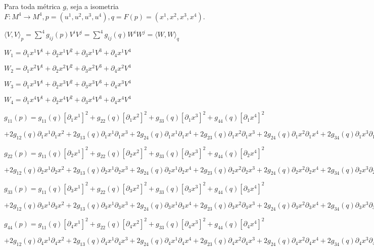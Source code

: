 		Para toda m\'etrica $g$, seja a isometria $F: M^4 \rightarrow M^4, p = (u^1, u^2, u^3, u^4), q = F(p) = (x^1, x^2, x^3, x^4)$.

		$\langle V, V\rangle_p = \sum^4 g_{ij}(p) V^i V^j = \sum^4 g_{ij}(q) W^i W^j = \langle W, W\rangle_q$

		$W_1 = \partial_1 x^1 V^1 + \partial_2 x^1 V^2 + \partial_3 x^1 V^3 + \partial_4 x^1 V^4$

		$W_2 = \partial_1 x^2 V^1 + \partial_2 x^2 V^2 + \partial_3 x^2 V^3 + \partial_4 x^2 V^4$

		$W_3 = \partial_1 x^3 V^1 + \partial_2 x^3 V^2 + \partial_3 x^3 V^3 + \partial_4 x^3 V^4$

		$W_4 = \partial_1 x^4 V^1 + \partial_2 x^4 V^2 + \partial_3 x^4 V^3 + \partial_4 x^4 V^4$

		$g_{11}(p) = g_{11}(q) [\partial_1 x^1]^2 + g_{22}(q) [\partial_1 x^2]^2 + g_{33}(q) [\partial_1 x^3]^2 + g_{44}(q) [\partial_1 x^4]^2$

		$+ 2 g_{12}(q) \partial_1 x^1 \partial_1 x^2 + 2 g_{13}(q) \partial_1 x^1 \partial_1 x^3 + 2 g_{24}(q) \partial_1 x^1 \partial_1 x^4 + 2 g_{23}(q) \partial_1 x^2 \partial_1 x^3 + 2 g_{24}(q) \partial_1 x^2 \partial_1 x^4 + 2 g_{34}(q) \partial_1 x^3 \partial_1 x^4$

		$g_{22}(p) = g_{11}(q) [\partial_2 x^1]^2 + g_{22}(q) [\partial_2 x^2]^2 + g_{33}(q) [\partial_2 x^3]^2 + g_{44}(q) [\partial_2 x^4]^2$

		$+ 2 g_{12}(q) \partial_2 x^1 \partial_2 x^2 + 2 g_{13}(q) \partial_2 x^1 \partial_2 x^3 + 2 g_{24}(q) \partial_2 x^1 \partial_2 x^4 + 2 g_{23}(q) \partial_2 x^2 \partial_2 x^3 + 2 g_{24}(q) \partial_2 x^2 \partial_2 x^4 + 2 g_{34}(q) \partial_2 x^3 \partial_2 x^4$

		$g_{33}(p) = g_{11}(q) [\partial_3 x^1]^2 + g_{22}(q) [\partial_3 x^2]^2 + g_{33}(q) [\partial_3 x^3]^2 + g_{44}(q) [\partial_3 x^4]^2$

		$+ 2 g_{12}(q) \partial_3 x^1 \partial_3 x^2 + 2 g_{13}(q) \partial_3 x^1 \partial_3 x^3 + 2 g_{24}(q) \partial_3 x^1 \partial_3 x^4 + 2 g_{23}(q) \partial_3 x^2 \partial_3 x^3 + 2 g_{24}(q) \partial_3 x^2 \partial_3 x^4 + 2 g_{34}(q) \partial_3 x^3 \partial_3 x^4$

		$g_{44}(p) = g_{11}(q) [\partial_4 x^1]^2 + g_{22}(q) [\partial_4 x^2]^2 + g_{33}(q) [\partial_4 x^3]^2 + g_{44}(q) [\partial_4 x^4]^2$

		$+ 2 g_{12}(q) \partial_4 x^1 \partial_4 x^2 + 2 g_{13}(q) \partial_4 x^1 \partial_4 x^3 + 2 g_{24}(q) \partial_4 x^1 \partial_4 x^4 + 2 g_{23}(q) \partial_4 x^2 \partial_4 x^3 + 2 g_{24}(q) \partial_4 x^2 \partial_4 x^4 + 2 g_{34}(q) \partial_4 x^3 \partial_4 x^4$

